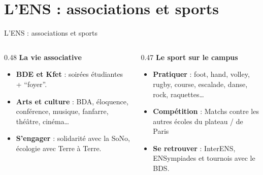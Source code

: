 \documentclass[11pt,aspectratio=169]{beamer}
\begin{document}
\section{L'ENS : associations et sports}
\begin{frame}{L'ENS : associations et sports}
  \begin{columns}[T,onlytextwidth]
    \begin{column}{0.48\textwidth}
      {\large\color{DauphineBleu}\bfseries La vie associative}\par\medskip
      \begin{itemize}
        \setlength{\itemsep}{4mm}
        \item \textbf{BDE et Kfet} : soirées étudiantes + ``foyer''.
        \item \textbf{Arts et culture} : BDA, éloquence, conférence, musique, fanfarre, théâtre, cinéma\ldots
        \item \textbf{S'engager} : solidarité avec la SoNo, écologie avec Terre à Terre.
      \end{itemize}
    \end{column}
    \begin{column}{0.47\textwidth}
      {\large\color{DauphineBleu}\bfseries Le sport sur le campus}\par\medskip
      \begin{itemize}
        \setlength{\itemsep}{4mm}
        \item \textbf{Pratiquer} : foot, hand, volley, rugby, course, escalade, danse, rock, raquettes\ldots
        \item \textbf{Compétition} : Matchs contre les autres écoles du plateau / de Paris 
        \item \textbf{Se retrouver} : InterENS, ENSympiades et tournois avec le BDS.
      \end{itemize}
    \end{column}
  \end{columns}
  \vfill
  {\color{DauphineBleu}}
\end{frame}
\end{document}
